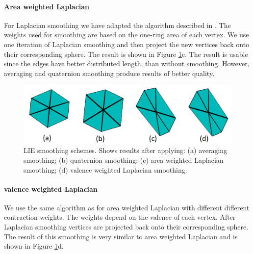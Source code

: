 \paragraph{Area weighted Laplacian}
For Laplacian smoothing we have adapted the algorithm described in \cite{laplac}. The weights used for smoothing are based on the one-ring area of each vertex. We use one iteration of Laplacian smoothing and then project the new vertices back onto their corresponding sphere. The result is shown in Figure \ref{fig:smoothing_ilu}c. The result is usable since the edges have better distributed length, than without smoothing. However, averaging and quaternion smoothing produce results of better quality.

\begin{figure}[h]
    \centering
    \includegraphics[width=\textwidth]{images/smoothing_ilu.png}
    \caption[LIE smoothing schemes]{LIE smoothing schemes. Shows results after applying: (a) averaging smoothing; (b) quaternion smoothing; (c) area weighted Laplacian smoothing; (d) valence weighted Laplacian smoothing.}
    \label{fig:smoothing_ilu}
\end{figure}

\paragraph{valence weighted Laplacian}
We use the same algorithm as for area weighted Laplacian with different different contraction weights. The weights depend on the valence of each vertex. After Laplacian smoothing vertices are projected back onto their corresponding sphere. The result of this smoothing is very similar to area weighted Laplacian and is shown in Figure \ref{fig:smoothing_ilu}d.


